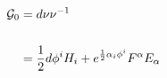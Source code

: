 \begin{equation}
\begin{aligned}
\mathcal{G}_{0}&=d\nu \nu ^{-1}\\
\\
&=\frac{1}{2}d\phi ^{i}H_{i}+e^{%
\frac{1}{2}\alpha _{i}\phi ^{i}}F^{\alpha }E_{\alpha }
\end{aligned}
\end{equation}


